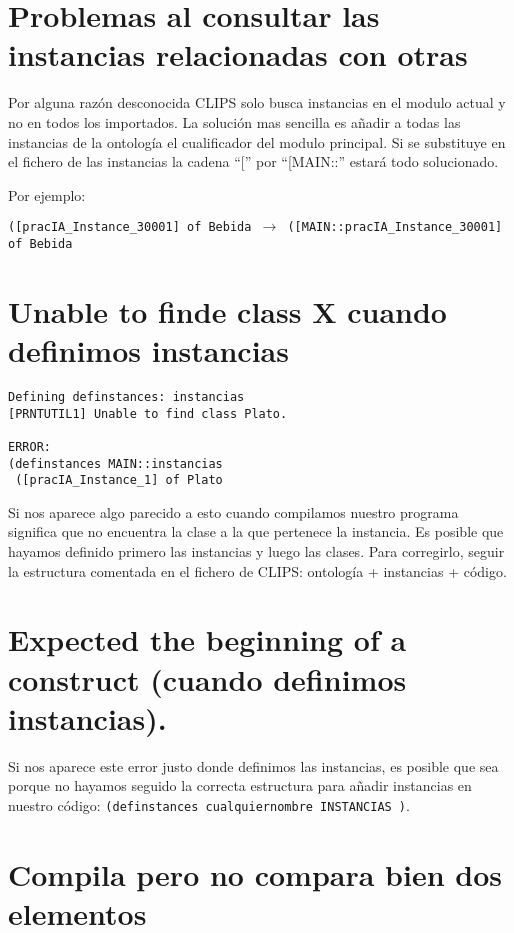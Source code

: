 \documentclass[11pt,svgnames]{scrbook}
\begin{document}
\section{Problemas al consultar las instancias relacionadas con otras}

Por alguna razón desconocida CLIPS solo busca instancias en el modulo actual y no en todos los importados.
La solución mas sencilla es añadir a todas las instancias de la ontología el cualificador del modulo principal. Si se substituye en el fichero de las instancias la cadena ``['' por ``[MAIN::'' estará todo solucionado.

Por ejemplo:
\medskip

\texttt{([pracIA\_Instance\_30001] of  Bebida $\rightarrow$ ([MAIN::pracIA\_Instance\_30001] of  Bebida}


\section{Unable to finde class X cuando definimos instancias}


\begin{verbatim}
Defining definstances: instancias
[PRNTUTIL1] Unable to find class Plato.

ERROR:
(definstances MAIN::instancias
 ([pracIA_Instance_1] of Plato\end{verbatim}

Si nos aparece algo parecido a esto cuando compilamos nuestro programa significa que no encuentra la
clase a la que pertenece la instancia. Es posible que hayamos definido primero las instancias y
luego las clases. Para corregirlo, seguir la estructura comentada en el fichero de CLIPS: ontología
+ instancias + código.

\section{Expected the beginning of a construct (cuando definimos instancias).}


Si nos aparece este error justo donde definimos las instancias, es posible que sea porque no hayamos seguido la correcta estructura para añadir instancias en nuestro código:
\texttt{(definstances cualquiernombre INSTANCIAS )}.


\section{Compila pero no compara bien dos elementos}
\end{document}
